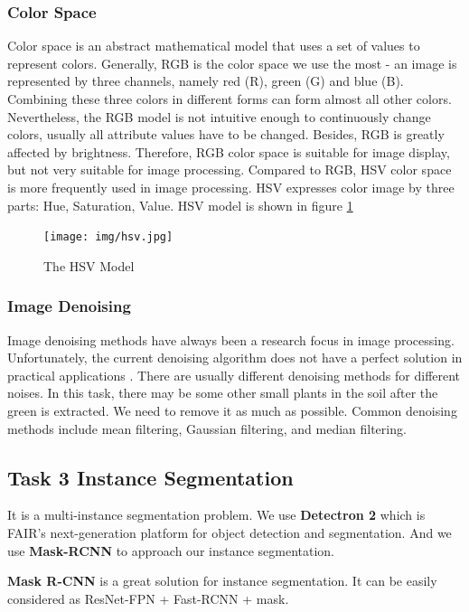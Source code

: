 \documentclass[conference]{IEEEtran}
\begin{document}
\subsubsection{Color Space}
Color space is an abstract mathematical model that uses a set of values to represent colors. Generally, RGB is the color space we use the most - an image is represented by three channels, namely red (R), green (G) and blue (B). Combining these three colors in different forms can form almost all other colors. Nevertheless, the RGB model is not intuitive enough to continuously change colors, usually all attribute values have to be changed. Besides, RGB is greatly affected by brightness. Therefore, RGB color space is suitable for image display, but not very suitable for image processing. Compared to RGB, HSV color space is more frequently used in image processing. HSV expresses color image by three parts: Hue, Saturation, Value. HSV model is shown in figure \ref{fig_HSV_model}

\begin{figure}
    \centering
    \texttt{[image: img/hsv.jpg]}
    \caption{The HSV Model}
    \label{fig_HSV_model}
\end{figure}

\subsubsection{Image Denoising}
Image denoising methods have always been a research focus in image processing. Unfortunately, the current denoising algorithm does not have a perfect solution in practical applications \cite{buades2005review}. There are usually different denoising methods for different noises. In this task, there may be some other small plants in the soil after the green is extracted. We need to remove it as much as possible. Common denoising methods include mean filtering, Gaussian filtering, and median filtering. 


\subsection{Task 3 Instance Segmentation}

It is a multi-instance segmentation problem. We use \textbf{Detectron 2}\cite{wu2019detectron2} which is FAIR's next-generation platform for object detection and segmentation. And we use \textbf{Mask-RCNN}\cite{He_2017} to approach our instance segmentation.

\textbf{Mask R-CNN} is a great solution for instance segmentation. It can be easily considered as ResNet-FPN + Fast-RCNN + mask.
\end{document}
